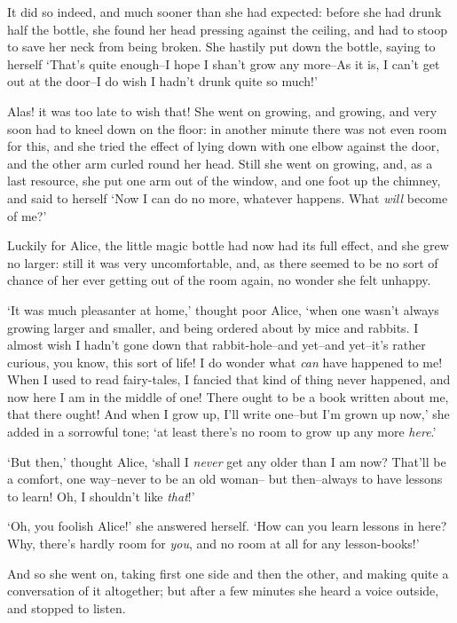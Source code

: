  It did so indeed, and much sooner than she had expected:
before she had drunk half the bottle, she found her head pressing
against the ceiling, and had to stoop to save her neck from being
broken.  She hastily put down the bottle, saying to herself
`That's quite enough--I hope I shan't grow any more--As it is, I
can't get out at the door--I do wish I hadn't drunk quite so
much!'

  Alas! it was too late to wish that!  She went on growing, and
growing, and very soon had to kneel down on the floor:  in
another minute there was not even room for this, and she tried
the effect of lying down with one elbow against the door, and the
other arm curled round her head.  Still she went on growing, and,
as a last resource, she put one arm out of the window, and one
foot up the chimney, and said to herself `Now I can do no more,
whatever happens.  What {\it will} become of me?'

  Luckily for Alice, the little magic bottle had now had its full
effect, and she grew no larger:  still it was very uncomfortable,
and, as there seemed to be no sort of chance of her ever getting
out of the room again, no wonder she felt unhappy.

  `It was much pleasanter at home,' thought poor Alice, `when one
wasn't always growing larger and smaller, and being ordered about
by mice and rabbits.  I almost wish I hadn't gone down that
rabbit-hole--and yet--and yet--it's rather curious, you know,
this sort of life!  I do wonder what {\it can} have happened to me!
When I used to read fairy-tales, I fancied that kind of thing
never happened, and now here I am in the middle of one!  There
ought to be a book written about me, that there ought!  And when
I grow up, I'll write one--but I'm grown up now,' she added in a
sorrowful tone; `at least there's no room to grow up any more
{\it here}.'

  `But then,' thought Alice, `shall I {\it never} get any older than I
am now?  That'll be a comfort, one way--never to be an old woman--
but then--always to have lessons to learn!  Oh, I shouldn't like {\it that}!'

  `Oh, you foolish Alice!' she answered herself.  `How can you
learn lessons in here?  Why, there's hardly room for {\it you}, and no
room at all for any lesson-books!'

  And so she went on, taking first one side and then the other,
and making quite a conversation of it altogether; but after a few
minutes she heard a voice outside, and stopped to listen.

